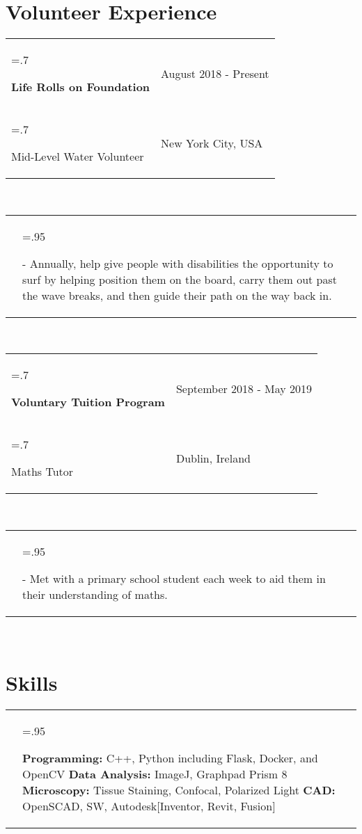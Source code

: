 \documentclass[letterpaper,11pt]{article}
\newcommand{\itemHeadings}[4]{
    \begin{tabularx}{\textwidth} {>{\hsize=.7\textwidth\raggedright\arraybackslash}X 
   >{\raggedleft\arraybackslash}X}
      #1 & \small#2 \\
      #3 & \small#4
    \end{tabularx}
    \\
}
\newcommand{\itemitems}[1]{
    \begin{tabularx}{\textwidth} {>{\raggedleft\arraybackslash}X >{\hsize=.95\textwidth\raggedright\arraybackslash}X}
      &- \small#1 \\
    \end{tabularx}
    \\
}
\newcommand{\projitems}[1]{
    \begin{tabularx}{\textwidth} {>{\raggedleft\arraybackslash}X | >{\hsize=.95\textwidth\raggedright\arraybackslash}X}
      & \small#1 \\
    \end{tabularx}
    \\
}
\begin{document}
\section*{Volunteer Experience}
    \itemHeadings
          {\textbf{Life Rolls on Foundation}}
          {August 2018 - Present}
          {Mid-Level Water Volunteer}
          {New York City, USA}
        \itemitems
            {Annually, help give people with disabilities the opportunity to surf by helping position them on the board, carry them out past the wave breaks, and then guide their path on the way back in.}
    \itemHeadings
          {\textbf{Voluntary Tuition Program}}
          {September 2018 - May 2019}
          {Maths Tutor}
          {Dublin, Ireland}
        \itemitems
            {Met with a primary school student each week to aid them in their understanding of maths.} 

\section*{Skills}
    \projitems
        {\textbf{Programming:} C++, Python including Flask, Docker, and OpenCV \textbf{Data Analysis:} ImageJ, Graphpad Prism 8 \newline \textbf{Microscopy:} Tissue Staining, Confocal, Polarized Light \textbf{CAD:} OpenSCAD, SW,  Autodesk[Inventor, Revit, Fusion]}


\end{document}
